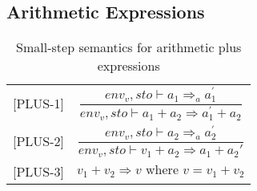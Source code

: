 \subsection{Arithmetic Expressions}

\iffalse
Old Plus
\begin{table}[H]
    \centering
    \begin{longtable}[c] { r c }
        [PLUS-1] & \( \dfrac{a_1 \Rightarrow a^{'}_{1}}{a_1 + a_2 \Rightarrow a^{'}_{1} + a_2} \) \\
        
        [PLUS-2] & \( \dfrac{a_2 \Rightarrow a^{'}_{2}}{v_1 + a_2 \Rightarrow v_1 + a^{'}_{2}} \) \\
        
        [PLUS-3] & \(z_1 + z_2 \Rightarrow z \text{ where } z = v_1 + v_2\) \\
    \end{longtable}
    \caption{Small-step semantics for arithmetic plus expressions}\label{tab:sss_aud}
\end{table}
\fi

\begin{table}[H]
    \centering
    \begin{longtable}[c] { r c }
        [PLUS-1] & \( \dfrac{ env_v,sto \vdash a_1 \Rightarrow_a a^{'}_{1}}{env_v,sto \vdash a_1 + a_2 \Rightarrow a^{'}_{1} + a_2} \) \\
        
        [PLUS-2] & \( \dfrac{ env_v,sto \vdash a_2 \Rightarrow_a a^{'}_{2}}{env_v,sto \vdash v_1 + a_2 \Rightarrow a_{1} + a_2{'}} \) \\
        
        [PLUS-3] & \(v_1 + v_2 \Rightarrow v \text{ where } v = v_1 + v_2\) \\
    \end{longtable}
    \caption{Small-step semantics for arithmetic plus expressions}\label{tab:sss_aud}
\end{table}

\iffalse
Old Plus
\begin{table}[H]
    \centering
    \begin{longtable}[c] { r c }
        
        [MINUS-1] & \( \dfrac{a_1 \Rightarrow a^{'}_{1}}{a_1 - a_2 \Rightarrow a^{'}_{1} - a_2} \) \\
        
        [MINUS-2] & \( \dfrac{a_2 \Rightarrow a^{'}_{2}}{v_1 - a_2 \Rightarrow v_1 - a^{'}_{2}} \) \\
        
        [MINUS-3] & \(v_1 - v_2 \Rightarrow z \text{ where } z = v_1 - v_2\) \\
        
        
    \end{longtable}
    \caption{Small-step semantics for arithmetic minus expressions}\label{tab:sss_aud}
\end{table}
\fi

